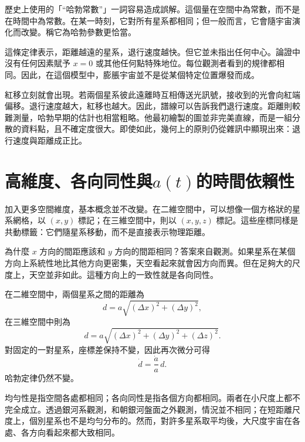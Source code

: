 歷史上使用的「``哈勃常數''」一詞容易造成誤解。這個量在空間中為常數，而不是在時間中為常數。在某一時刻，它對所有星系都相同；但一般而言，它會隨宇宙演化而改變。稱它為哈勃參數更恰當。

這條定律表示，距離越遠的星系，退行速度越快。但它並未指出任何中心。論證中沒有任何因素賦予 \(x=0\) 或其他任何點特殊地位。每位觀測者看到的規律都相同。因此，在這個模型中，膨脹宇宙並不是從某個特定位置爆發而成。

紅移立刻就會出現。若兩個星系彼此遠離時互相傳送光訊號，接收到的光會向紅端偏移。退行速度越大，紅移也越大。因此，譜線可以告訴我們退行速度。距離則較難測量，哈勃早期的估計也相當粗略。他最初繪製的圖並非完美直線，而是一組分散的資料點，且不確定度很大。即使如此，幾何上的原則仍從雜訊中顯現出來：退行速度與距離成正比。

\begin{classroomqa}
\end{classroomqa}

\section{高維度、各向同性與\(a(t)\)的時間依賴性}

加入更多空間維度，基本概念並不改變。在二維空間中，可以想像一個方格狀的星系網格，以 \((x,y)\) 標記；在三維空間中，則以 \((x,y,z)\) 標記。這些座標同樣是共動標籤：它們隨星系移動，而不是直接表示物理距離。

為什麼 \(x\) 方向的間距應該和 \(y\) 方向的間距相同？答案來自觀測。如果星系在某個方向上系統性地比其他方向更密集，天空看起來就會因方向而異。但在足夠大的尺度上，天空並非如此。這種方向上的一致性就是各向同性。

在二維空間中，兩個星系之間的距離為
\begin{equation}
d=a\sqrt{(\Delta x)^2+(\Delta y)^2},
\end{equation}
在三維空間中則為
\begin{equation}
d=a\sqrt{(\Delta x)^2+(\Delta y)^2+(\Delta z)^2}.
\end{equation}
對固定的一對星系，座標差保持不變，因此再次微分可得
\begin{equation}
\dot d=\frac{\dot a}{a}\,d.
\end{equation}
哈勃定律仍然不變。

均勻性是指空間各處都相同；各向同性是指各個方向都相同。兩者在小尺度上都不完全成立。透過銀河系觀測，和朝銀河盤面之外觀測，情況並不相同；在短距離尺度上，個別星系也不是均勻分布的。然而，對許多星系取平均後，大尺度宇宙在各處、各方向看起來都大致相同。

